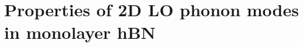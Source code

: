 \documentclass[aps,prb,twocolumn,
	           groupedaddress,superscriptaddress,
               amsfonts,amssymb,amsmath,floatfix,
	           citeautoscript]{revtex4-1}
\newcommand{\iu}{\mathrm{i}}
\newcommand{\comment}[2]{%
    \ifbool{togglecomments}%
    {\textcolor{blue!70!black}{\small\textsf{%
    \textsuperscript{\textsc{\textsf{\MakeLowercase{#1}}}}%
    [#2]}}} %
    {}}     %
\newcommand{\citeremind}[1]{%
	\unskip%
    \textcolor{blue!75!black!80!yellow}{${}^\blacksquare$%
	\ifthenelse{\isempty{#1}}{}{\textsuperscript{\tiny\textsf{#1}}}%
	}\xspace}
\begin{document}




\section{Properties of 2D LO phonon modes in monolayer hBN}
\end{document}
